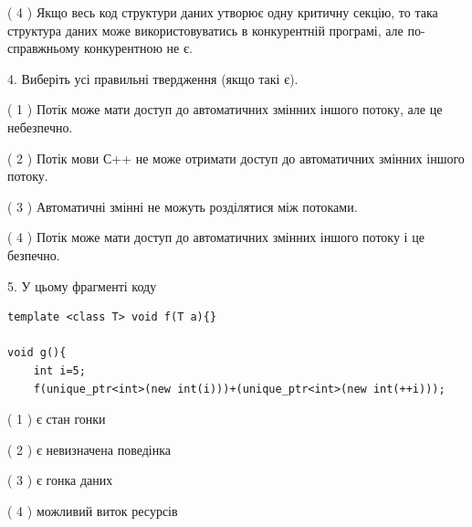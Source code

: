 \documentclass[12pt, ukrainian]{article}
\begin{document}
\begin {large}
{( 4 ) Якщо весь код структури даних утворює одну критичну секцію, то така структура даних може використовуватись в конкурентній програмі, але по-справжньо\-му конкурентною не є.%


4. Виберіть усі правильні твердження (якщо такі є).\par
\vspace{2mm}

( 1 ) Потік може мати доступ до автоматичних змінних іншого потоку, але це небезпечно.%

( 2 ) Потік мови С++ не може отримати доступ до автоматичних змінних іншого потоку.%

( 3 ) Автоматичні змінні не можуть розділятися між потоками.%

( 4 ) Потік може мати доступ до автоматичних змінних іншого потоку і це безпечно.%


5. У цьому фрагменті коду
\begin{verbatim}
template <class T> void f(T a){}

void g(){
    int i=5;
    f(unique_ptr<int>(new int(i)))+(unique_ptr<int>(new int(++i)));
\end{verbatim}
( 1 ) є стан гонки%

( 2 ) є невизначена поведінка%

( 3 ) є гонка даних%

( 4 ) можливий виток ресурсів%
}
\end {large}
\end{document}
